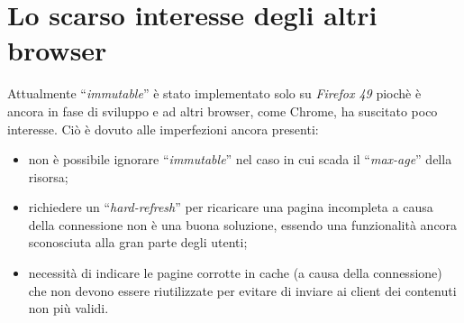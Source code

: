 \documentclass[a4paper,12pt]{report}
\begin{document}
\section{Lo scarso interesse degli altri browser}
Attualmente “{\itshape immutable}” è stato implementato solo su {\itshape Firefox 49} piochè è ancora in fase di sviluppo e ad altri browser, come Chrome, ha suscitato poco interesse. Ciò è dovuto alle imperfezioni ancora presenti:
\begin{itemize}
\item non è possibile ignorare “{\itshape immutable}” nel caso in cui scada il “{\itshape max-age}” della risorsa;
\item richiedere un “{\itshape hard-refresh}” per ricaricare una pagina incompleta a causa della connessione non è una buona soluzione, essendo una funzionalità ancora sconosciuta alla gran parte degli utenti;
\item necessità di indicare le pagine corrotte in cache (a causa della connessione) che non devono essere riutilizzate per evitare di inviare ai client dei contenuti non più validi.
\end{itemize}
\end{document}
